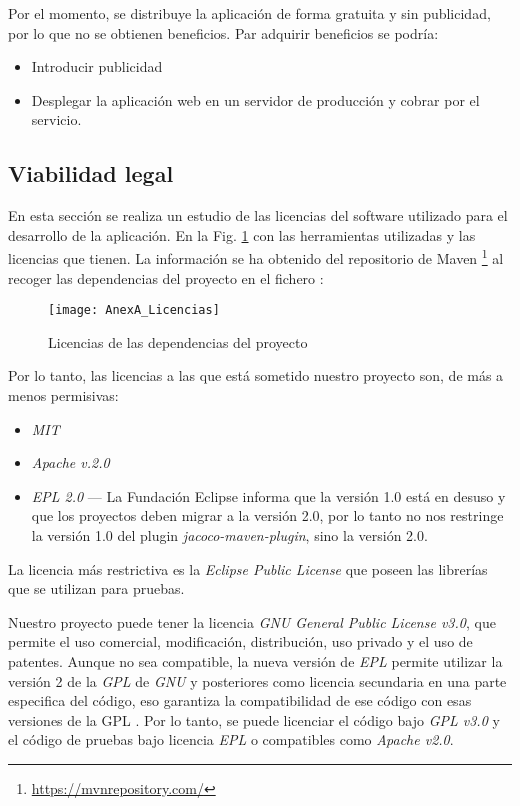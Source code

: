 Por el momento, se distribuye la aplicación de forma gratuita y sin publicidad, por lo que no se obtienen beneficios. Par adquirir beneficios se podría:
\begin{itemize}
	\item Introducir publicidad
	\item Desplegar la aplicación web en un servidor de producción y cobrar por el servicio.
\end{itemize}

\subsection{Viabilidad legal}
En esta sección se realiza un estudio de las licencias del software utilizado para el desarrollo de la aplicación. En la Fig. \ref{fig:AnexA_Licencias} con las herramientas utilizadas y las licencias que tienen. La información se ha obtenido del repositorio de Maven \footnote{\url{https://mvnrepository.com/}} al recoger las dependencias del proyecto en el fichero :

\begin{figure}[!h]
	\centering
	\texttt{[image: AnexA\_Licencias]}
	\caption{Licencias de las dependencias del proyecto}
	\label{fig:AnexA_Licencias}
\end{figure}
\FloatBarrier

Por lo tanto, las licencias a las que está sometido nuestro proyecto son, de más a menos permisivas:
\begin{itemize}
	\item \textit{MIT}
	\item \textit{Apache v.2.0}
	\item \textit{EPL 2.0} --- La Fundación Eclipse informa que la versión 1.0 está en desuso y que los proyectos deben migrar a la versión 2.0, por lo tanto no nos restringe la versión 1.0 del plugin \textit{jacoco-maven-plugin}, sino la versión 2.0.
\end{itemize}

La licencia más restrictiva es la \textit{Eclipse Public License} que poseen las librerías que se utilizan para pruebas.

Nuestro proyecto puede tener la licencia \textit{GNU General Public License v3.0}, que permite el uso comercial, modificación, distribución, uso privado y el uso de patentes. Aunque no sea compatible, la nueva versión de \textit{EPL} permite utilizar la versión 2 de la \textit{GPL} de \textit{GNU} y posteriores como licencia secundaria en una parte especifica del código, eso garantiza la compatibilidad de ese código con esas versiones de la GPL \cite{santiago_lista_2019}. Por lo tanto, se puede licenciar el código bajo \textit{GPL v3.0} y el código de pruebas bajo licencia \textit{EPL} o compatibles como \textit{Apache v2.0}.